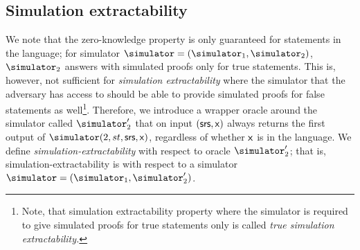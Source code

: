 \subsection{Simulation extractability}
We note that the zero-knowledge property is only guaranteed for statements in the
language; for simulator $\simulator = (\simulator_1, \simulator_2)$, $\simulator_2$
answers with simulated proofs only for true statements.  This is, however, not sufficient
for \emph{simulation extractability} where the simulator that the adversary has access to
should be able to provide simulated proofs for false statements as well\footnote{Note,
  that simulation extractability property where the simulator is required to give
  simulated proofs for true statements only is called \emph{true simulation
    extractability.}}. Therefore, we introduce a wrapper oracle around the simulator
called $\simulator'_2$ that on input $(\mathsf{srs}, \mathsf{x})$ always returns the first output of
$\simulator (2, st, \srs, \inp)$, regardless of whether $\mathsf{x}$ is in the language. We
define \emph{simulation-extractability} with respect to oracle $\simulator_2'$; that is,
simulation-extractability is with respect to a simulator
$\simulator = (\simulator_1, \simulator_2')$.
%

